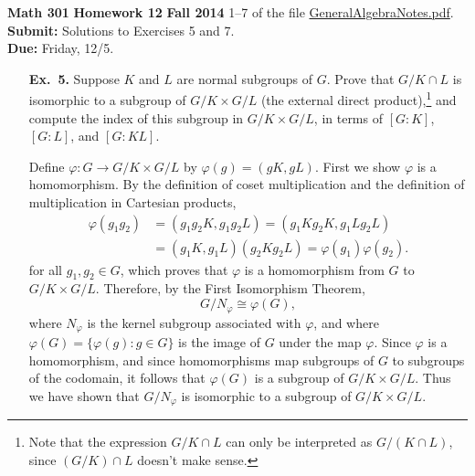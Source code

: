 \documentclass[12pt,reqno]{amsart}
\newcommand{\<}{\ensuremath{\langle}}
\renewcommand{\>}{\ensuremath{\rangle}}
\begin{document}
\thispagestyle{empty}

\noindent \textbf{Math 301} \hskip5cm {\bf Homework 12} \hfill {\bf Fall 2014}
\vskip1cm
 1--7 of the file
\href{https://github.com/williamdemeo/Math301-Fall2014/blob/master/misc/GeneralAlgebraNotes.pdf?raw=true}{GeneralAlgebraNotes.pdf}.\\
{\bf Submit:}  Solutions to Exercises 5 and 7.
\\
{\bf Due:} Friday, 12/5.

\bigskip

\begin{enumerate}
\item[{\bf Ex.~5.}] 
    Suppose $K$ and $L$ are normal subgroups of $G$. Prove that $G/K\cap L$ is
    isomorphic to a subgroup of $G/K \times G/L$ (the external direct
    product),\footnote{Note 
      that the expression $G/K\cap L$ can only be interpreted as $G/(K\cap L)$,
      since $(G/K)\cap L$ doesn't make sense.} and compute the index
    of this subgroup in $G/K \times G/L$, 
    in terms of $[G:K]$, $[G:L]$, and $[G:KL]$.

\medskip
\newcommand\GKGL{\ensuremath{G/K \times G/L}}

Define $\varphi: G \rightarrow G/K \times G/L$ by $\varphi(g) = (gK, gL)$.
First we show $\varphi$ is a homomorphism. By the definition of coset
multiplication and the definition of multiplication in Cartesian
products,
\begin{align*}
\varphi(g_1 g_2) &= 
(g_1 g_2K,g_1 g_2L) = (g_1 Kg_2K,g_1 Lg_2L)\\
 &= (g_1 K,g_1L) (g_2K g_2L) = \varphi(g_1)\varphi(g_2).
\end{align*}
for all $g_1, g_2 \in G$, which proves that $\varphi$ is a homomorphism
from $G$ to $\GKGL$.
Therefore, by the First Isomorphism Theorem, 
\[
G/N_\varphi \cong \varphi(G),
\] 
where $N_\varphi$ is the kernel subgroup associated with $\varphi$, and 
where $\varphi(G) = \{ \varphi(g) : g\in G\}$ is the image of $G$ under the map
$\varphi$. Since $\varphi$ is a homomorphism, and since homomorphisms map
subgroups of $G$ to subgroups of the codomain, it follows that 
$\varphi(G)$ is a subgroup of $\GKGL$. 
Thus we have shown that $G/N_\varphi$ is isomorphic to a subgroup of $\GKGL$. 


\end{enumerate}
\end{document}
